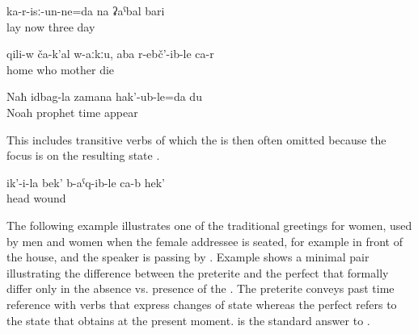 \begin{exe}
	\ex	\label{ex:I have been lying (in the hospital) for three days analytic}
	\gll	ka-r-isː-un-ne=da	na	ʡaˁbal	bari\\
		lay	now	three	day\\
	\glt	{}

	\ex	\label{ex:There is nobody at home, my mother has died analytic}
	\gll	qili-w	ča-k'al	w-aːkːu,	aba	r-ebč'-ib-le	ca-r\\
		home	who		mother	die	\\
	\glt	{}

	\ex	\label{ex:I was born at the time of the prophet Noah}
	\gll	Naħ	idbag-la	zamana	hak'-ub-le=da	du\\
		Noah	prophet	time	appear	\\
	\glt	{}
\end{exe}

This includes transitive verbs of which the  is then often omitted because the focus is on the resulting state .

\begin{exe}
	\ex	\label{ex:Her head has been wounded}
	\gll	ik'-i-la	bek'	b-aˁq-ib-le	ca-b	hek'\\
			head	wound		\\
	\glt	{}
\end{exe}

The following example illustrates one of the traditional greetings for women, used by men and women when the female addressee is seated, for example in front of the house, and the speaker is passing by . Example  shows a minimal pair illustrating the difference between the preterite and the perfect that formally differ only in the absence vs. presence of the . The preterite conveys past time reference with verbs that express changes of state whereas the perfect refers to the state that obtains at the present moment.  is the standard answer to .

